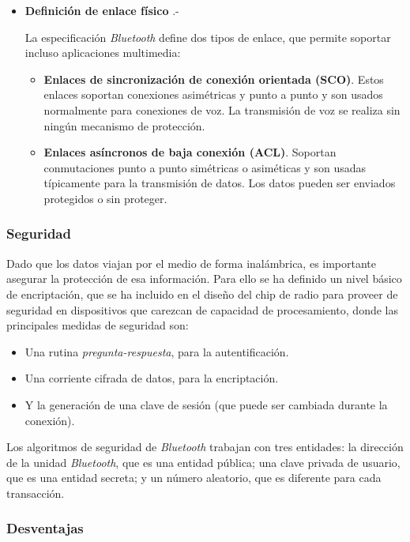 \begin{itemize}
\item \textbf{Definición de enlace físico} .-

La especificación \emph{Bluetooth} define dos tipos de enlace, que permite
soportar incluso aplicaciones multimedia:
\begin{itemize}
\item \textbf{Enlaces de sincronización de conexión orientada (SCO)}. Estos
enlaces soportan conexiones asimétricas y punto a punto y son usados
normalmente para conexiones de voz. La transmisión de voz se realiza sin
ningún mecanismo de protección.
\item \textbf{Enlaces asíncronos de baja conexión (ACL)}. Soportan
conmutaciones punto a punto simétricas o asiméticas y son usadas típicamente
para la transmisión de datos. Los datos pueden ser enviados protegidos o
sin proteger.
\end{itemize}
\end{itemize}

  \subsubsection{Seguridad}

Dado que los datos viajan por el medio de forma inalámbrica, es importante
asegurar la protección de esa información. Para ello se ha definido un nivel
básico de encriptación, que se ha incluido en el diseño del chip de radio
para proveer de seguridad en dispositivos que carezcan de capacidad de 
procesamiento, donde las principales medidas de seguridad son:
\begin{itemize}
\item Una rutina \emph{pregunta-respuesta}, para la autentificación.
\item Una corriente cifrada de datos, para la encriptación.
\item Y la generación de una clave de sesión (que puede ser cambiada durante
la conexión).
\end{itemize}
Los algoritmos de seguridad de \emph{Bluetooth} trabajan con tres entidades:
la dirección de la unidad \emph{Bluetooth}, que es una entidad pública; una
clave privada de usuario, que es una entidad secreta; y un número aleatorio,
que es diferente para cada transacción.

  \subsubsection{Desventajas}

